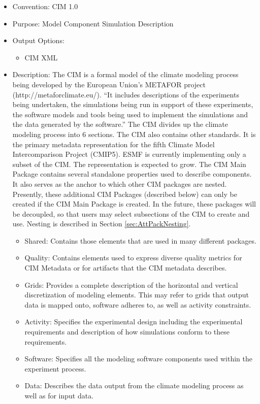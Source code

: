 \begin{itemize}
    \item Convention: CIM 1.0
    \item Purpose: Model Component Simulation Description
    \item Output Options: 
    \begin{itemize}
        \item CIM XML
    \end{itemize}  
\item Description: The CIM is a formal model of the climate modeling process being developed by the European Union's METAFOR project (http://metaforclimate.eu/). ``It includes descriptions of the experiments being undertaken, the simulations being run in support of these experiments, the software models and tools being used to implement the simulations and the data generated by the software.'' The CIM divides up the climate modeling process into 6 sections. The CIM also contains other standards. It is the primary metadata representation for the fifth Climate Model Intercomparison Project (CMIP5). ESMF is currently implementing only a subset of the CIM. The representation is expected to grow. The CIM Main Package contains several standalone properties used to describe components. It also serves as the anchor to which other CIM packages are nested. Presently, these additional CIM Packages (described below) can only be created if the CIM Main Package is created. In the future, these packages will be decoupled, so that users may select subsections of the CIM to create and use. Nesting is described in Section \ref{sec:AttPackNesting}.
    \begin{itemize}
       \item Shared: Contains those elements that are used in many different packages. 
       \item Quality: Contains elements used to express diverse quality metrics for CIM Metadata or for artifacts that the CIM metadata describes.
       \item Grids: Provides a complete description of the horizontal and vertical discretization of modeling elements. This may refer to grids that output data is mapped onto, software adheres to, as well as activity constraints. 
       \item Activity: Specifies the experimental design including the experimental requirements and description of how simulations conform to these requirements.
       \item Software: Specifies all the modeling software components used within the experiment process. 
       \item Data: Describes the data output from the climate modeling process as well as for input data. 
    \end{itemize}
\end{itemize}

